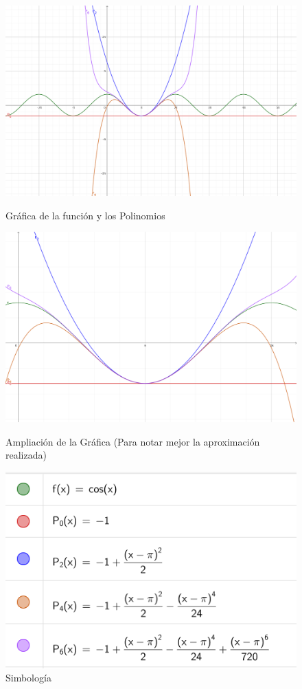 \begin{figure}
    \centering
    \includegraphics[height = 0.25\textheight]{recursos/polinomios/29.png}\par
    \caption*{Gráfica de la función y los Polinomios}
    \includegraphics[height = 0.25\textheight]{recursos/polinomios/29zoom.png}\par
    \caption*{Ampliación de la Gráfica (Para notar mejor la aproximación realizada)}
    \includegraphics[height = 0.25\textheight]{recursos/polinomios/29Leyenda.png}\par
    \caption*{Simbología}
\end{figure}